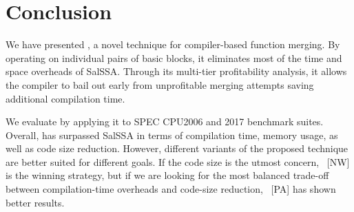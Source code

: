 \section{Conclusion}


We have presented \ProjName, a novel technique for compiler-based function merging. By operating on individual pairs of basic blocks, it eliminates most of the time and space overheads of SalSSA. Through its multi-tier profitability analysis, it allows the compiler to bail out early from unprofitable merging attempts saving additional compilation time.

We evaluate \ProjName by applying it to SPEC CPU2006 and 2017 benchmark suites.
Overall, \ProjName has surpassed SalSSA in terms of compilation time, memory usage, as well as code size reduction.
However, different variants of the proposed technique are better suited for different goals.
If the code size is the utmost concern, {\ProjName}~[NW] is the winning strategy, but if we are looking for the most balanced trade-off between compilation-time overheads and code-size reduction, {\ProjName}~[PA] has shown better results.

